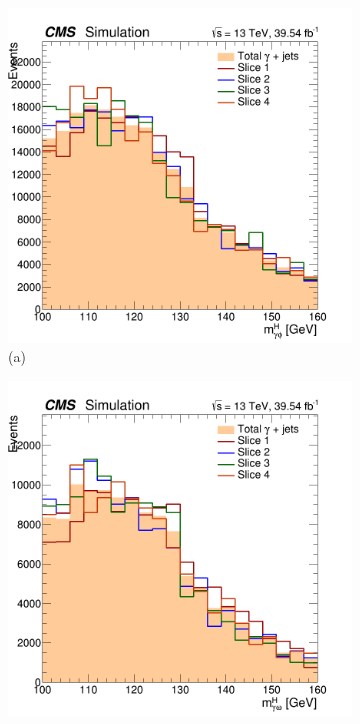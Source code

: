 \begin{figure}[!ht]
    \captionsetup[subfigure]{labelformat=empty}
    \vspace*{-0.2cm}
    \centering
    \setlength{\mylength}{\textwidth}
    \begin{subfigure}[t]{0.50\mylength}
        \centering
        \includegraphics[width=0.45\mylength]{resources/plots/Phi3_fit_BKG_MH_sliced.png}
        \caption{\footnotesize (a)}
    \end{subfigure}%
    \begin{subfigure}[t]{0.50\mylength}
        \centering
        \includegraphics[width=0.45\mylength]{resources/plots/Omega_fit_BKG_MH_sliced.png}

\end{subfigure}
\end{figure}
